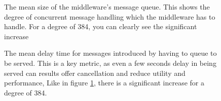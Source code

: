 \begin{figure}[h] 
  \centering
  \label{FIG:APX:QSIZE}
  \caption{The mean size of the middleware's message queue. This shows the
  degree of concurrent message handling which the middleware has to handle. For
  a degree of 384, you can clearly see the significant increase}
\end{figure}

\begin{figure}[h] 
  \centering
  \label{FIG:APX:QDELAY}
  \caption{The mean delay time for messages introduced by having to queue to be
  served. This is a key metric, as even a few seconds delay in being served can
  results offer cancellation and reduce utility and performance, Like in figure
  \ref{FIG:APX:QSIZE}, there is a significant increase for a degree of 384.}
\end{figure}


